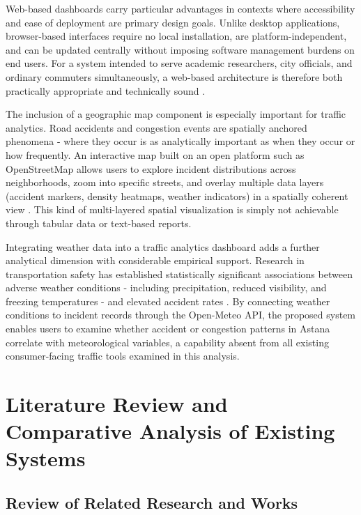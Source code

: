 \documentclass[12pt,a4paper]{report}
\begin{document}
Web-based dashboards carry particular advantages in contexts where
accessibility and ease of deployment are primary design goals. Unlike
desktop applications, browser-based interfaces require no local
installation, are platform-independent, and can be updated centrally
without imposing software management burdens on end users. For a system
intended to serve academic researchers, city officials, and ordinary
commuters simultaneously, a web-based architecture is therefore both
practically appropriate and technically sound \cite{praharaj2022,
miranda2024}.

The inclusion of a geographic map component is especially important
for traffic analytics. Road accidents and congestion events are
spatially anchored phenomena - where they occur is as analytically
important as when they occur or how frequently. An interactive map
built on an open platform such as OpenStreetMap allows users to explore
incident distributions across neighborhoods, zoom into specific
streets, and overlay multiple data layers (accident markers, density
heatmaps, weather indicators) in a spatially coherent view
\cite{osm2024, salameh2024}. This kind of multi-layered spatial
visualization is simply not achievable through tabular data or
text-based reports.

Integrating weather data into a traffic analytics dashboard adds a
further analytical dimension with considerable empirical support.
Research in transportation safety has established statistically
significant associations between adverse weather conditions -
including precipitation, reduced visibility, and freezing temperatures
- and elevated accident rates \cite{becker2022, liang2023}. By
connecting weather conditions to incident records through the
Open-Meteo API, the proposed system enables users to examine whether
accident or congestion patterns in Astana correlate with meteorological
variables, a capability absent from all existing consumer-facing
traffic tools examined in this analysis.

\section{Literature Review and Comparative Analysis of Existing Systems}

\subsection{Review of Related Research and Works}
\end{document}

